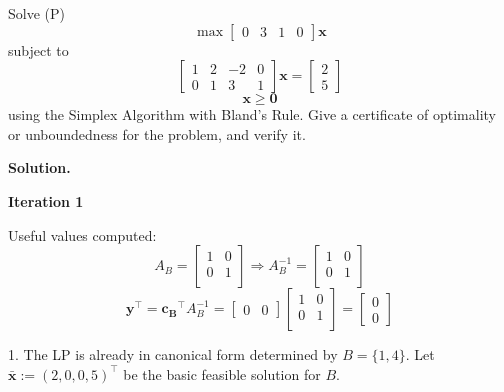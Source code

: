 \begin{exbox}
    \begin{example}
        Solve (P)
        \[ \max
            \begin{bmatrix}
                0 & 3 & 1 & 0
            \end{bmatrix}\bm{x} \]
        subject to
        \[
            \begin{bmatrix}
                1 & 2 & -2 & 0 \\
                0 & 1 & 3  & 1
            \end{bmatrix}\bm{x}=
            \begin{bmatrix}
                2 \\
                5
            \end{bmatrix} \]
        \[ \bm{x}\geqslant  \bm{0} \]
        using the Simplex Algorithm with Bland's Rule. Give a certificate
        of optimality or unboundedness for the problem, and verify it.

        \textbf{Solution.}

        \textbf{Iteration 1}

        Useful values computed:
        \[ A_B=
            \begin{bmatrix}
                1 & 0 \\
                0 & 1 \\
            \end{bmatrix} \Rightarrow
            A_B^{-1}=
            \begin{bmatrix}
                1 & 0 \\
                0 & 1 \\
            \end{bmatrix} \]
        \[ \bm{y}^\top=\bm{c_B}^\top A_B^{-1}=
            \begin{bmatrix}
                0 & 0
            \end{bmatrix}
            \begin{bmatrix}
                1 & 0 \\
                0 & 1 \\
            \end{bmatrix}=
            \begin{bmatrix}
                0 \\
                0
            \end{bmatrix}\]

        1. The LP is already in canonical form determined by $ B=\{1,4\} $.
        Let $ \bm{\bar{x}}:=(2,0,0,5)^\top $ be the basic feasible solution for $ B $.


\end{example}
\end{exbox}
